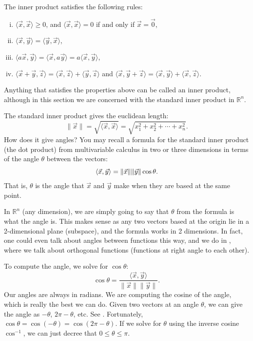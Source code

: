 The inner product satisfies the following rules:
\begin{enumerate}[(i)]
\item $\langle \vec{x} , \vec{x} \rangle \geq 0$, and
$\langle \vec{x} , \vec{x} \rangle = 0$ if and only if $\vec{x} = \vec{0}$,
\item $\langle \vec{x} , \vec{y} \rangle = \langle \vec{y} , \vec{x}
\rangle$,
\item $\langle a\vec{x} , \vec{y} \rangle =
\langle \vec{x} , a\vec{y} \rangle =
a \langle \vec{x} , \vec{y} \rangle$,
\item $\langle \vec{x} +  \vec{y} , \vec{z} \rangle =
\langle \vec{x} , \vec{z} \rangle +
\langle \vec{y} , \vec{z} \rangle$ and
$\langle \vec{x}, \vec{y} + \vec{z} \rangle =
\langle \vec{x} , \vec{y} \rangle +
\langle \vec{x} , \vec{z} \rangle$.
\end{enumerate}
Anything that satisfies the properties above can be called an inner
product, although in this section we are concerned with the
standard inner product in ${\mathbb{R}}^n$.

\medskip

The standard inner product gives the euclidean length:
\begin{equation*}
\lVert{\vec{x}}\rVert = \sqrt{\langle \vec{x}, \vec{x} \rangle}
= \sqrt{x_1^2 + x_2^2 + \cdots + x_n^2} .
\end{equation*}
How does it give angles?
You may recall a formula
for the standard inner product (the dot product)
from multivariable calculus in
two or three dimensions
in terms of
the angle $\theta$ between the vectors:
\begin{equation*}
\langle \vec{x}, \vec{y} \rangle
=
\lVert{\vec{x}}\rVert \lVert{\vec{y}}\rVert \cos \theta.
\avoidbreak
\end{equation*}
That is, $\theta$ is the angle that $\vec{x}$ and $\vec{y}$ make
when they are based at the same point.

In ${\mathbb{R}}^n$ (any dimension), we are simply going to say that $\theta$
from the formula is what the angle is.
This makes sense as any two vectors based at the origin
lie in a 2-dimensional plane (subspace),
and the formula works in 2 dimensions.
In fact, one could even talk about angles between functions this way, and
we do in , where we talk about orthogonal functions
(functions at right angle to each other).

To compute the angle, we solve for $\cos \theta$:
\begin{equation*}
\cos \theta
=
\frac{\langle \vec{x}, \vec{y} \rangle}{\lVert{\vec{x}}\rVert
\lVert{\vec{y}}\rVert} .
\end{equation*}
Our angles are always in radians.
We are computing the cosine of the angle,
which is really the best
we can do.  Given two vectors at an angle $\theta$, we can give the angle as
$-\theta$, $2\pi-\theta$, etc.
See .
Fortunately,
$\cos \theta = \cos (-\theta) = \cos(2\pi - \theta)$.
If we solve for $\theta$ using the inverse cosine $\cos^{-1}$,
we can just decree that $0 \leq \theta \leq \pi$.

